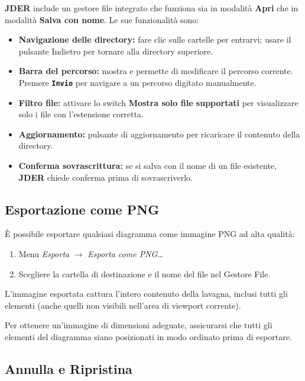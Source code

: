 \documentclass[a4paper,11pt]{article}
\newcommand{\key}[1]{\texttt{\textbf{#1}}}
\newcommand{\menu}[1]{\textit{#1}}
\newcommand{\uielement}[1]{\textbf{#1}}
\newcommand{\jder}{\textbf{JDER}}
\begin{document}
\jder{} include un gestore file integrato che funziona sia in modalità \textbf{Apri} che in
modalità \textbf{Salva con nome}. Le sue funzionalità sono:

\begin{itemize}
  \item \textbf{Navigazione delle directory:} fare clic sulle cartelle per entrarvi; usare il
        pulsante Indietro per tornare alla directory superiore.
  \item \textbf{Barra del percorso:} mostra e permette di modificare il percorso corrente.
        Premere \key{Invio} per navigare a un percorso digitato manualmente.
  \item \textbf{Filtro file:} attivare lo switch \uielement{Mostra solo file supportati} per
        visualizzare solo i file con l'estensione corretta.
  \item \textbf{Aggiornamento:} pulsante di aggiornamento per ricaricare il contenuto della
        directory.
  \item \textbf{Conferma sovrascrittura:} se si salva con il nome di un file esistente,
        \jder{} chiede conferma prima di sovrascriverlo.
\end{itemize}

\subsection{Esportazione come PNG}

È possibile esportare qualsiasi diagramma come immagine PNG ad alta qualità:

\begin{enumerate}
  \item Menu \menu{Esporta} $\to$ \menu{Esporta come PNG\ldots}
  \item Scegliere la cartella di destinazione e il nome del file nel Gestore File.
\end{enumerate}

L'immagine esportata cattura l'intero contenuto della lavagna, inclusi tutti gli elementi
(anche quelli non visibili nell'area di viewport corrente).

\begin{tcolorbox}[tipbox, title={Suggerimento}]
  Per ottenere un'immagine di dimensioni adeguate, assicurarsi che tutti gli elementi del
  diagramma siano posizionati in modo ordinato prima di esportare.
\end{tcolorbox}

\subsection{Annulla e Ripristina}
\end{document}
